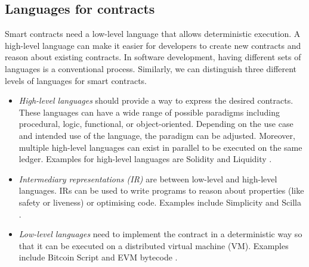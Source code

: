 
\subsection{Languages for contracts}

Smart contracts need a low-level language that allows deterministic execution. 
A high-level language can make it easier for developers to create new contracts and reason about existing contracts.
In software development, having different sets of languages is a conventional process.
Similarly, we can distinguish three different levels of languages for smart contracts.

\begin{itemize}
\item \emph{High-level languages} should provide a way to express the desired contracts. These languages can have a wide range of possible paradigms including procedural, logic, functional, or object-oriented. Depending on the use case and intended use of the language, the paradigm can be adjusted. Moreover, multiple high-level languages can exist in parallel to be executed on the same ledger. Examples for high-level languages are Solidity \cite{Ethereum2018Solidity} and Liquidity \cite{OCamlProSAS2018}.
\item \emph{Intermediary representations (IR)} are between low-level and high-level languages. IRs can be used to write programs to reason about properties (like safety or liveness) or optimising code. Examples include Simplicity \cite{OConnor2017} and Scilla \cite{Sergey2018}.
\item \emph{Low-level languages} need to implement the contract in a deterministic way so that it can be executed on a distributed virtual machine (VM). Examples include Bitcoin Script \cite{BitcoinWiki2018Script} and EVM bytecode \cite{Wood2014}.
\end{itemize}

